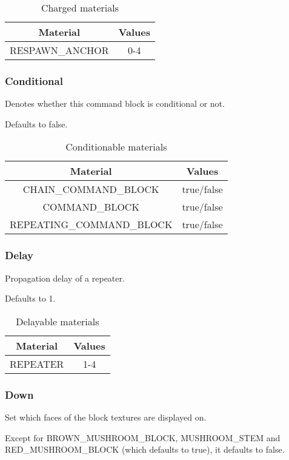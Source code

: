 \begin{table}[H]
	\centering
	\begin{tabular}{ |c|c| }
		\hline
		Material & Values \\
		\hline
		RESPAWN\_ANCHOR & 0-4 \\
		\hline
	\end{tabular}
	\caption{Charged materials}
\end{table}

\subsubsection{Conditional}\label{spigot-types:conditional}
Denotes whether this command block is conditional or not.

Defaults to false.

\begin{table}[H]
	\centering
	\begin{tabular}{ |c|c| }
		\hline
		Material & Values \\
		\hline
		CHAIN\_COMMAND\_BLOCK & true/false \\
		COMMAND\_BLOCK & true/false \\
		REPEATING\_COMMAND\_BLOCK & true/false \\
		\hline
	\end{tabular}
	\caption{Conditionable materials}
\end{table}

\subsubsection{Delay}\label{spigot-types:delay}
Propagation delay of a repeater.

Defaults to 1.

\begin{table}[H]
	\centering
	\begin{tabular}{ |c|c| }
		\hline
		Material & Values \\
		\hline
		REPEATER & 1-4 \\
		\hline
	\end{tabular}
	\caption{Delayable materials}
\end{table}

\subsubsection{Down}
Set which faces of the block textures are displayed on.

Except for BROWN\_MUSHROOM\_BLOCK, MUSHROOM\_STEM and RED\_MUSHROOM\_BLOCK (which defaults to true), it defaults to false.


